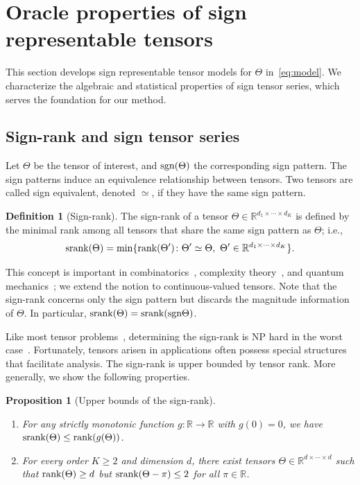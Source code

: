 \documentclass[twoside,11pt]{article}
\theoremstyle{plain}
\newtheorem{prop}{Proposition}
\theoremstyle{definition}
\newtheorem{defn}{Definition}
\def\sign{\textup{sgn}}
\def\srank{\textup{srank}}
\def\rank{\textup{rank}}
\begin{document}
\section{Oracle properties of sign representable tensors}\label{sec:representation}
This section develops sign representable tensor models for $\Theta$ in~\eqref{eq:model}. We characterize the algebraic and statistical properties of sign tensor series, which serves the foundation for our method. 

\subsection{Sign-rank and sign tensor series}\label{sec:sign-rank}
Let $\Theta$ be the tensor of interest, and $\sign (\Theta)$ the corresponding sign pattern. The sign patterns induce an equivalence relationship between tensors. Two tensors are called sign equivalent, denoted $\simeq$, if they have the same sign pattern.

\begin{defn}[Sign-rank]
The sign-rank of a tensor $\Theta\in\mathbb{R}^{d_1\times \cdots \times d_K}$ is defined by the minimal rank among all tensors that share the same sign pattern as $\Theta$; i.e.,
\[
\srank(\Theta) = \min \{\rank(\Theta')\colon  \Theta'\simeq \Theta,\ \Theta'\in\mathbb{R}^{d_1\times \cdots \times d_K}\}.
\]
\end{defn}
This concept is important in combinatorics~\citep{cohn2013fast}, complexity theory~\citep{alon2016sign}, and quantum mechanics~\citep{de2003nondeterministic}; we extend the notion to continuous-valued tensors. Note that the sign-rank concerns only the sign pattern but discards the magnitude information of $\Theta$. In particular, $\srank(\Theta)=\srank(\sign \Theta)$. 

Like most tensor problems~\citep{hillar2013most}, determining the sign-rank is NP hard in the worst case~\citep{alon2016sign}. Fortunately, tensors arisen in applications often possess special structures that facilitate analysis. The sign-rank is upper bounded by tensor rank. More generally, we show the following properties.
\begin{prop}[Upper bounds of the sign-rank]~\label{cor:monotonic} \hfill
\begin{enumerate}[label={2.\arabic*},wide, labelwidth=!, labelindent=0pt,itemsep=0ex,parsep=0ex,topsep=-7pt]
\item[(a)] [Upper bounds] For any strictly monotonic function $g\colon \mathbb{R}\to \mathbb{R}$ with $g(0)=0$,  we have $\textup{srank}(\Theta)\leq\rank(g(\Theta))$.
\item[(b)] [Broadness] For every order $K\geq 2$ and dimension $d$, there exist tensors $\Theta\in\mathbb{R}^{d\times \cdots \times d}$ such that $\rank(\Theta)\geq d$ but $\srank(\Theta-\pi)\leq 2$ for all $\pi\in\mathbb{R}$.  
\end{enumerate}
\end{prop}
\end{document}
